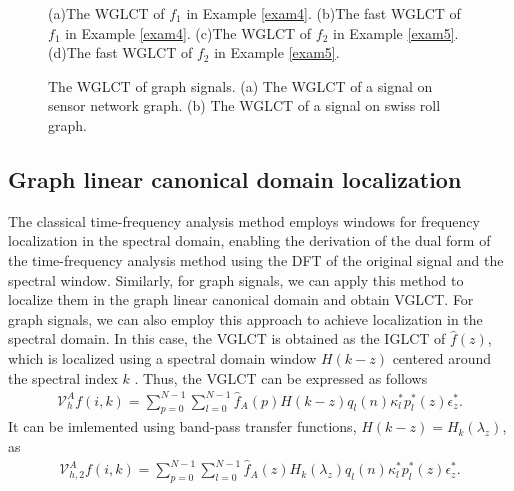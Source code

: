 \documentclass[lettersize,journal]{IEEEtran}
\begin{document}
\begin{figure}
	\centering
	\quad
	\caption{(a)The WGLCT of $f_1$ in Example \ref{exam4}. (b)The fast WGLCT of $f_1$ in Example \ref{exam4}. (c)The WGLCT of $f_2$ in Example \ref{exam5}. (d)The fast WGLCT of $f_2$ in Example \ref{exam5}. }\label{fig9}
\end{figure}

\begin{figure}
	\centering
	\caption{The WGLCT of graph signals. (a) The WGLCT of a signal on sensor network graph. (b) The WGLCT of a signal on swiss roll graph. }\label{fig3}
\end{figure}


\subsection{Graph linear canonical domain localization} 
\label{sec3.2}
The classical time-frequency analysis method employs windows for frequency localization in the spectral domain, enabling the derivation of the dual form of the time-frequency analysis method using the DFT of the original signal and the spectral window. Similarly, for graph signals, we can apply this method to localize them in the graph linear canonical domain and obtain VGLCT. 
For graph signals, we can also employ this approach to achieve localization in the spectral domain. In this case, the VGLCT is obtained as the IGLCT of $\hat{f}(z)$, which is localized using a spectral domain window $H(k - z)$ centered around the spectral index $k$ \cite{stankovic2020vertex}. Thus, the VGLCT can be expressed as follows
\begin{align}
	\mathcal{V}_h^Af(i,k)
	= \sum_{p=0}^{N-1} \sum_{l=0}^{N-1} \hat{f}_{A}(p) H(k-z)
	q_l(n) \kappa_l^{*} p_l^*(z) \epsilon_z^{*}.
\end{align}
It can be imlemented using band-pass transfer functions, $H(k - z)=H_k(\lambda_z)$, as
\begin{align}
	\mathcal{V}_{h,2}^Af(i,k)
	= \sum_{p=0}^{N-1} \sum_{l=0}^{N-1} \hat{f}_{A}(z) H_k(\lambda_z)
	q_l(n) \kappa_l^{*} p_l^*(z) \epsilon_z^{*}.
\end{align}
\end{document}
